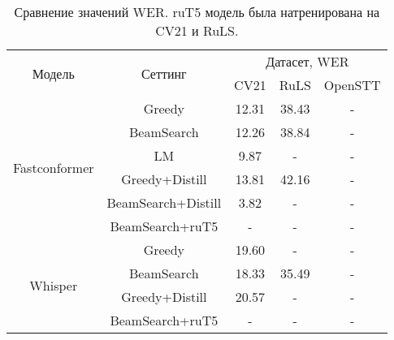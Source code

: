 \begin{table}[]
\centering
\caption{Сравнение значений WER. ruT5 модель была натренирована на CV21 и RuLS.}
\begin{tabular}{|c|c|ccc|}
\hline
\multirow{2}{*}{Модель}        & \multirow{2}{*}{Сеттинг}             & \multicolumn{3}{c|}{Датасет, WER}                                    \\ \cline{3-5} 
                               &                                      & \multicolumn{1}{c|}{CV21}  & \multicolumn{1}{c|}{RuLS}     & OpenSTT \\ \hline
\multirow{6}{*}{Fastconformer} & Greedy                               & \multicolumn{1}{c|}{12.31} & \multicolumn{1}{c|}{38.43}    & -       \\ \cline{2-5} 
                               & BeamSearch                           & \multicolumn{1}{c|}{12.26} & \multicolumn{1}{c|}{38.84}    & -       \\ \cline{2-5} 
                               & LM                                   & \multicolumn{1}{c|}{9.87}  & \multicolumn{1}{c|}{-}    & -       \\ \cline{2-5} 
                               & Greedy+Distill                       & \multicolumn{1}{c|}{13.81} & \multicolumn{1}{c|}{42.16}    & -       \\ \cline{2-5} 
                               & BeamSearch+Distill                   & \multicolumn{1}{c|}{3.82}  & \multicolumn{1}{c|}{-}    & -       \\ \cline{2-5} 
                               & BeamSearch+ruT5                      & \multicolumn{1}{c|}{-}     & \multicolumn{1}{c|}{-}    & -       \\ \hline
\multirow{4}{*}{Whisper}       & Greedy                               & \multicolumn{1}{c|}{19.60} & \multicolumn{1}{c|}{-}    & -       \\ \cline{2-5} 
                               & BeamSearch                           & \multicolumn{1}{c|}{18.33} & \multicolumn{1}{c|}{35.49}    & -       \\ \cline{2-5} 
                               & Greedy+Distill                       & \multicolumn{1}{c|}{20.57} & \multicolumn{1}{c|}{-}    & -       \\ \cline{2-5} 
                               & BeamSearch+ruT5                      & \multicolumn{1}{c|}{-}     & \multicolumn{1}{c|}{-}    & -       \\ \hline
\end{tabular}
\label{tab:res_full}
\end{table}

